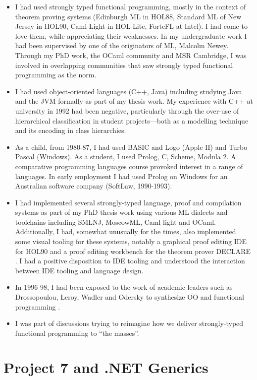 \documentclass[acmsmall,screen]{acmart}
\begin{document}
\begin{itemize}
\item I had used strongly typed functional programming, mostly in the context of theorem proving systems (Edinburgh ML in HOL88, Standard ML
of New Jersey in HOL90, Caml-Light in HOL-Lite, ForteFL at Intel). I had come to love them, while appreciating their weaknesses. In my undergraduate work
I had been supervised by one of the originators of ML, Malcolm Newey. Through my PhD work, the OCaml community and MSR Cambridge, I was
involved in overlapping communities that saw strongly typed functional programming as the norm.
\item I had used object-oriented languages (C++, Java) including studying Java and the JVM formally as part of my thesis work.  My
experience with C++ at university in 1992 had been negative, particularly through the over-use of hierarchical classification in student
projects---both as a modelling technique and its encoding in class hierarchies.  
\item As a child, from 1980-87, I had used BASIC and Logo (Apple II) and Turbo Pascal (Windows). As a student, I used Prolog, C, Scheme, Modula 2. A
comparative programming languages course provoked interest in a range of languages. In early employment I had used Prolog on Windows for an Australian
software company (SoftLaw, 1990-1993). 
\item I had implemented several strongly-typed language, proof and compilation systems as part of my PhD thesis work using various ML dialects and
toolchains including SMLNJ, MoscowML, Caml-light and OCaml. Additionally, I had, somewhat unusually for the times, also implemented some visual tooling
for these systems, notably a graphical proof editing IDE for HOL90 \citep{Syme1995} and a proof editing workbench for the theorem prover DECLARE \citep{Syme99threetactic}.  I
had a positive disposition to IDE tooling and understood the interaction between IDE tooling and language design.
\item In 1996-98, I had been exposed to the work of academic leaders such as Drossopoulou, Leroy, Wadler and Odersky to synthesize OO and functional
programming \citep{AlvesFoss1999}.
\item I was part of discussions trying to reimagine how we deliver strongly-typed functional programming to “the masses”.
\end{itemize}

\section*{Project 7 and .NET Generics}
\end{document}
